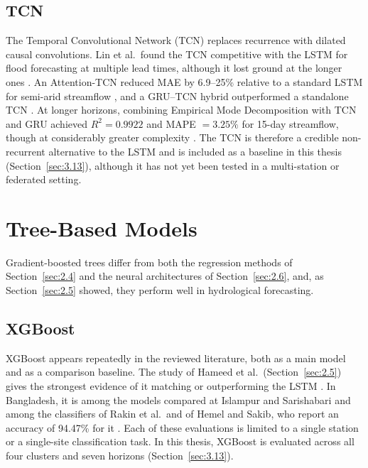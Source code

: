 \subsection{TCN}
\label{sec:2.6.4}

The Temporal Convolutional Network (TCN) replaces recurrence with dilated
causal convolutions. Lin et al.\ found the TCN competitive with the LSTM for
flood forecasting at multiple lead times, although it lost ground at the
longer ones \cite{Lin2021}. An Attention-TCN reduced MAE by 6.9--25\% relative
to a standard LSTM for semi-arid streamflow \cite{Li2024}, and a GRU--TCN hybrid
outperformed a standalone TCN \cite{Ni2024}. At longer horizons, combining
Empirical Mode Decomposition with TCN and GRU achieved $R^2 = 0.9922$ and
MAPE $= 3.25\%$ for 15-day streamflow, though at considerably greater
complexity \cite{Li2025}. The TCN is therefore a credible non-recurrent
alternative to the LSTM and is included as a baseline in this thesis
(Section~\ref{sec:3.13}), although it has not yet been tested in a
multi-station or federated setting.

\section{Tree-Based Models}
\label{sec:2.7}

Gradient-boosted trees differ from both the regression methods of
Section~\ref{sec:2.4} and the neural architectures of Section~\ref{sec:2.6},
and, as Section~\ref{sec:2.5} showed, they perform well in hydrological
forecasting.

\subsection{XGBoost}
\label{sec:2.7.1}

XGBoost appears repeatedly in the reviewed literature, both as a main model
and as a comparison baseline. The study of Hameed et al.\
(Section~\ref{sec:2.5}) gives the strongest evidence of it matching or
outperforming the LSTM \cite{Hameed2025}. In Bangladesh, it is among the models
compared at Islampur and Sarishabari \cite{Hossain2025,Islam2026b} and among
the classifiers of Rakin et al.\ and of Hemel and Sakib, who report an accuracy
of 94.47\% for it \cite{Rakin2023,HemelSakib2024}. Each of these evaluations is
limited to a single station or a single-site classification task. In this
thesis, XGBoost is evaluated across all four clusters and seven horizons
(Section~\ref{sec:3.13}).


